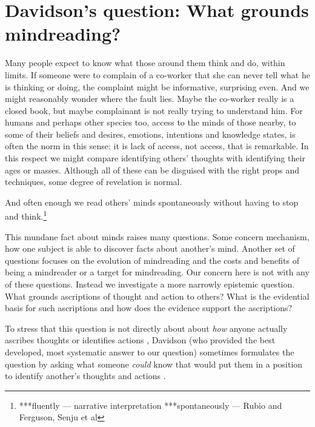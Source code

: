 \documentclass[12pt,a4paper]{extarticle}
\begin{document}
\setlength\footnotesep{1em}


\maketitle

\begin{abstract}
***
\end{abstract}


\section{Davidson's question: What grounds mindreading?}
Many people expect to know what those around them think and do, within limits.
If someone were to complain of a co-worker that she can never tell what he is thinking or doing,
the complaint might be informative, surprising even.
And we might reasonably wonder where the fault lies.
Maybe the co-worker really is a closed book,
but maybe complainant is not really trying to understand him.
For humans and perhaps other species too,
access to the minds of those nearby,
to some of their beliefs and desires,
emotions, intentions and knowledge states,
is often the norm in this sense: it is lack of access, not access, that is remarkable.
In this respect we might compare identifying others' thoughts with identifying their ages or masses.
Although all of these can be disguised with the right props and techniques, some degree of revelation is normal.

And often enough we read others' minds spontaneously
without having to stop and think.\footnote{
***fluently --- narrative interpretation
***spontaneously --- Rubio and Ferguson, Senju et al
}

This mundane fact about minds raises many questions.
Some concern mechanism, how one subject is able to discover facts about another's mind.
Another set of questions focuses on the evolution of mindreading and the costs and benefits of being a mindreader or a target for mindreading.
Our concern here is not with any of these questions.
Instead we investigate a more narrowly epistemic question.
What grounds ascriptions of thought and action to others?
What is the evidential basis for such ascriptions and how does the evidence support the ascriptions?

To stress that this question is not directly about about \emph{how} anyone actually ascribes thoughts or identifies actions%
, Davidson (who provided the best developed, most systematic answer to our question)
sometimes formulates the question by asking what someone \emph{could} know that would put them in a position to identify another's thoughts and actions \citep[e.g.][p.\ 126]{Davidson:1973jx}.
\end{document}
